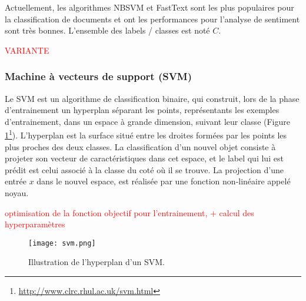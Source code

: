 Actuellement, les algorithmes NBSVM et FastText sont les plus populaires pour la classification de documents et ont les performances pour l'analyse de sentiment sont très bonnes. L'ensemble des labels / classes est noté $C$.

\textcolor{red}{VARIANTE}

\subsubsection{Machine à vecteurs de support (SVM)}
Le SVM \citep{vapnik1995statlearning} est un algorithme de classification binaire, qui construit, lors de la phase d'entrainement un hyperplan séparant les points, représentants les exemples d'entrainement, dans un espace à grande dimension, suivant leur classe (Figure \ref{fig:sensresultat:svm}\footnote{\url{http://www.clrc.rhul.ac.uk/svm.html}}). L'hyperplan est la surface situé entre les droites formées par les points les plus proches des deux classes. La classification d'un nouvel objet consiste à projeter son vecteur de caractéristiques dans cet espace, et le label qui lui est prédit est celui associé à la classe du coté où il se trouve. La projection d'une entrée $x$ dans le nouvel espace, est réalisée par une fonction non-linéaire appelé noyau.

\textcolor{red}{optimisation de la fonction objectif pour l'entrainement, + calcul des hyperparamètres}

\begin{figure}[!htb]
	\centering
	\texttt{[image: svm.png]}
	\caption{Illustration de l'hyperplan d'un SVM.}\label{fig:sensresultat:svm}
\end{figure}

